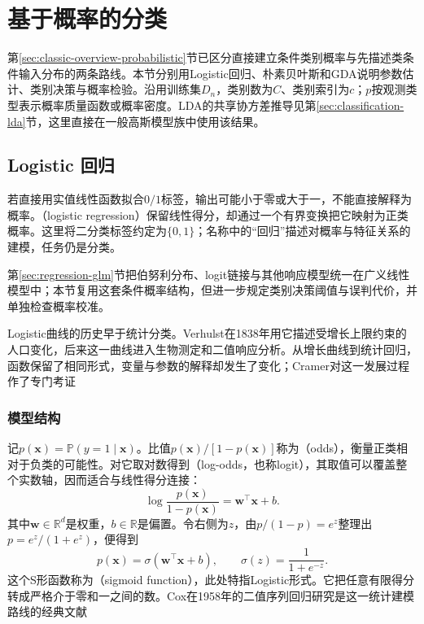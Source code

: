 \section{基于概率的分类}
\label{sec:classification-probability}

第\ref{sec:classic-overview-probabilistic}节已区分直接建立条件类别概率与先描述类条件输入分布的两条路线。本节分别用Logistic回归、朴素贝叶斯和GDA说明参数估计、类别决策与概率检验。沿用训练集$D_n$，类别数为$C$、类别索引为$c$；$p$按观测类型表示概率质量函数或概率密度。LDA的共享协方差推导见第\ref{sec:classification-lda}节，这里直接在一般高斯模型族中使用该结果。

\subsection{Logistic 回归}
\label{sec:classification-logistic}

若直接用实值线性函数拟合$0/1$标签，输出可能小于零或大于一，不能直接解释为概率。（logistic regression）保留线性得分，却通过一个有界变换把它映射为正类概率。这里将二分类标签约定为$\{0,1\}$；名称中的“回归”描述对概率与特征关系的建模，任务仍是分类。

第\ref{sec:regression-glm}节把伯努利分布、logit链接与其他响应模型统一在广义线性模型中；本节复用这套条件概率结构，但进一步规定类别决策阈值与误判代价，并单独检查概率校准。

Logistic曲线的历史早于统计分类。Verhulst在1838年用它描述受增长上限约束的人口变化，后来这一曲线进入生物测定和二值响应分析。从增长曲线到统计回归，函数保留了相同形式，变量与参数的解释却发生了变化；Cramer对这一发展过程作了专门考证

\subsubsection{模型结构}
\label{sec:classification-logistic-structure}

记$p(\bm{x})=\mathbb{P}(y=1\mid\bm{x})$。比值$p(\bm{x})/[1-p(\bm{x})]$称为（odds），衡量正类相对于负类的可能性。对它取对数得到（log-odds，也称logit），其取值可以覆盖整个实数轴，因而适合与线性得分连接：
\begin{equation}
  \label{eq:classification-logistic-logodds}
  \log\frac{p(\bm{x})}{1-p(\bm{x})}
  =\bm{w}^{\top}\bm{x}+b.
\end{equation}
其中$\bm{w}\in\mathbb{R}^{d}$是权重，$b\in\mathbb{R}$是偏置。令右侧为$z$，由$p/(1-p)=e^z$整理出$p=e^z/(1+e^z)$，便得到
\begin{equation}
  \label{eq:classification-logistic-sigmoid}
  p(\bm{x})=\sigma(\bm{w}^{\top}\bm{x}+b),
  \qquad
  \sigma(z)=\frac{1}{1+e^{-z}}.
\end{equation}
这个S形函数称为（sigmoid function），此处特指Logistic形式。它把任意有限得分转成严格介于零和一之间的数。Cox在1958年的二值序列回归研究是这一统计建模路线的经典文献

